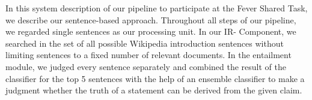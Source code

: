 In this system description of our pipeline to participate at the Fever Shared  Task, we describe our sentence-based approach. Throughout all steps of our pipeline, we regarded single sentences as our processing unit. In our IR- Component, we searched in the set of all possible Wikipedia introduction sentences without limiting sentences to a fixed number of relevant documents. In  the entailment module, we judged every sentence separately and combined the result of the classifier for the top 5 sentences with the help of an ensemble classifier to make a judgment whether the truth of a statement can be derived from the given claim.
